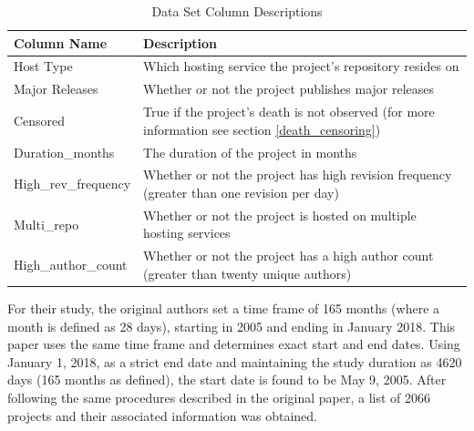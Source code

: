 \documentclass[acmconf]{acmart}
\begin{document}
\begin{table}[!ht]
    \caption{Data Set Column Descriptions}
    \label{tab:data}
    \begin{tabular}{ll}
        \toprule
        Column Name & Description \\
        \midrule
        Host Type            & Which hosting service the project's repository resides on \\
        Major Releases       & Whether or not the project publishes major releases \\
        Censored             & True if the project's death is not observed (for more information see section \ref{death_censoring}) \\
        Duration\_months     & The duration of the project in months \\
        High\_rev\_frequency & Whether or not the project has high revision frequency (greater than one revision per day) \\
        Multi\_repo          & Whether or not the project is hosted on multiple hosting services\\
        High\_author\_count  & Whether or not the project has a high author count (greater than twenty unique authors) \\
        \bottomrule
    \end{tabular}
\end{table}

For their study, the original authors set a time frame of 165 months (where a month is defined as 28 days), starting in 2005 and ending in January 2018.
This paper uses the same time frame and determines exact start and end dates.
Using January 1, 2018, as a strict end date and maintaining the study duration as 4620 days (165 months as defined), the start date is found to be May 9, 2005.
After following the same procedures described in the original paper, a list of 2066 projects and their associated information was obtained.


\end{document}
